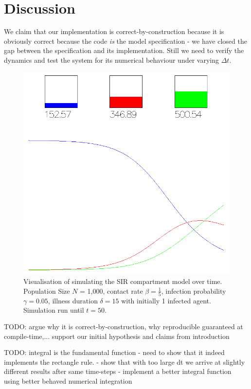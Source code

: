 \section{Discussion}
We claim that our implementation is correct-by-construction because it is obviously correct because the code \textit{is} the model specification - we have closed the gap between the specification and its implementation. Still we need to verify the dynamics and test the system for its numerical behaviour under varying $\Delta t$.

\begin{figure}
	\centering
	\includegraphics[width=.4\textwidth, angle=0]{./fig/visualisation_t50.png}
	\caption{Visualisation of simulating the SIR compartment model over time. Population Size $N$ = 1,000, contact rate $\beta =  \frac{1}{5}$, infection probability $\gamma = 0.05$, illness duration $\delta = 15$ with initially 1 infected agent. Simulation run until $t = 50$.}
	\label{fig:sir_sd_dynamics}
\end{figure}

TODO: argue why it is correct-by-construction, why reproducible guaranteed at compile-time,... support our initial hypothesis and claims from introduction

TODO: integral is the fundamental function
- need to show that it indeed implements the rectangle rule. 
- show that with too large dt we arrive at slightly different results after same time-steps
- implement a better integral function using better behaved numerical integration